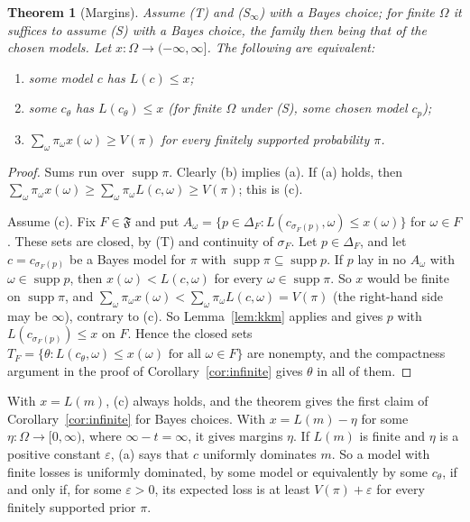 \documentclass[11pt]{article}
\newtheorem{theorem}{Theorem}[section]
\theoremstyle{definition}
\theoremstyle{remark}
\newcommand{\F}{\mathfrak F}
\newcommand{\supp}{\operatorname{supp}}
\begin{document}
\begin{theorem}[Margins]\label{thm:margin}
Assume (T) and (S$_\infty$) with a Bayes choice; for finite $\Omega$ it suffices to assume (S) with a Bayes choice, the family then being that of the chosen models. Let $x:\Omega\to(-\infty,\infty]$. The following are equivalent:
\begin{enumerate}[label=(\alph*)]
\item some model $c$ has $L(c)\le x$;
\item some $c_\theta$ has $L(c_\theta)\le x$ (for finite $\Omega$ under (S), some chosen model $c_p$);
\item $\sum_\omega\pi_\omega x(\omega)\ge V(\pi)$ for every finitely supported probability $\pi$.
\end{enumerate}
\end{theorem}
\begin{proof}
Sums run over $\supp\pi$. Clearly (b) implies (a). If (a) holds, then $\sum_\omega\pi_\omega x(\omega)\ge\sum_\omega\pi_\omega L(c,\omega)\ge V(\pi)$; this is (c).

Assume (c). Fix $F\in\F$ and put $A_\omega=\{p\in\Delta_F:L(c_{\sigma_F(p)},\omega)\le x(\omega)\}$ for $\omega\in F$. These sets are closed, by (T) and continuity of $\sigma_F$. Let $p\in\Delta_F$, and let $c=c_{\sigma_F(p)}$ be a Bayes model for $\pi$ with $\supp\pi\subseteq\supp p$. If $p$ lay in no $A_\omega$ with $\omega\in\supp p$, then $x(\omega)<L(c,\omega)$ for every $\omega\in\supp\pi$. So $x$ would be finite on $\supp\pi$, and $\sum_\omega\pi_\omega x(\omega)<\sum_\omega\pi_\omega L(c,\omega)=V(\pi)$ (the right-hand side may be $\infty$), contrary to (c). So Lemma~\ref{lem:kkm} applies and gives $p$ with $L(c_{\sigma_F(p)})\le x$ on $F$. Hence the closed sets $T_F=\{\theta:L(c_\theta,\omega)\le x(\omega)\text{ for all }\omega\in F\}$ are nonempty, and the compactness argument in the proof of Corollary~\ref{cor:infinite} gives $\theta$ in all of them.
\end{proof}
With $x=L(m)$, (c) always holds, and the theorem gives the first claim of Corollary~\ref{cor:infinite} for Bayes choices. With $x=L(m)-\eta$ for some $\eta:\Omega\to[0,\infty)$, where $\infty-t=\infty$, it gives margins $\eta$. If $L(m)$ is finite and $\eta$ is a positive constant $\varepsilon$, (a) says that $c$ uniformly dominates $m$. So a model with finite losses is uniformly dominated, by some model or equivalently by some $c_\theta$, if and only if, for some $\varepsilon>0$, its expected loss is at least $V(\pi)+\varepsilon$ for every finitely supported prior $\pi$.
\end{document}
